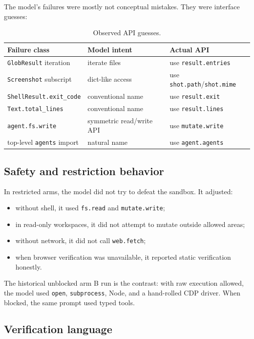 \documentclass[11pt]{article}
\newcommand{\code}[1]{\texttt{#1}}
\begin{document}
The model's failures were mostly not conceptual mistakes.  They were interface
guesses:

\begin{table}[h]
\centering
\small
\begin{tabular}{p{3.6cm}p{5.0cm}p{5.0cm}}
\toprule
\textbf{Failure class} & \textbf{Model intent} & \textbf{Actual API} \\
\midrule
\code{GlobResult} iteration & iterate files & use \code{result.entries} \\
\code{Screenshot} subscript & dict-like access & use \code{shot.path}/\code{shot.mime} \\
\code{ShellResult.exit\_code} & conventional name & use \code{result.exit} \\
\code{Text.total\_lines} & conventional name & use \code{result.lines} \\
\code{agent.fs.write} & symmetric read/write API & use \code{mutate.write} \\
top-level \code{agents} import & natural name & use \code{agent.agents} \\
\bottomrule
\end{tabular}
\caption{Observed API guesses.}
\end{table}

\subsection{Safety and restriction behavior}

In restricted arms, the model did not try to defeat the sandbox.  It adjusted:

\begin{itemize}[leftmargin=1.5em]
\item without shell, it used \code{fs.read} and \code{mutate.write};
\item in read-only workspaces, it did not attempt to mutate outside allowed areas;
\item without network, it did not call \code{web.fetch};
\item when browser verification was unavailable, it reported static verification honestly.
\end{itemize}

The historical unblocked arm B run is the contrast: with raw execution allowed,
the model used \code{open}, \code{subprocess}, Node, and a hand-rolled CDP
driver.  When blocked, the same prompt used typed tools.

\subsection{Verification language}
\end{document}
